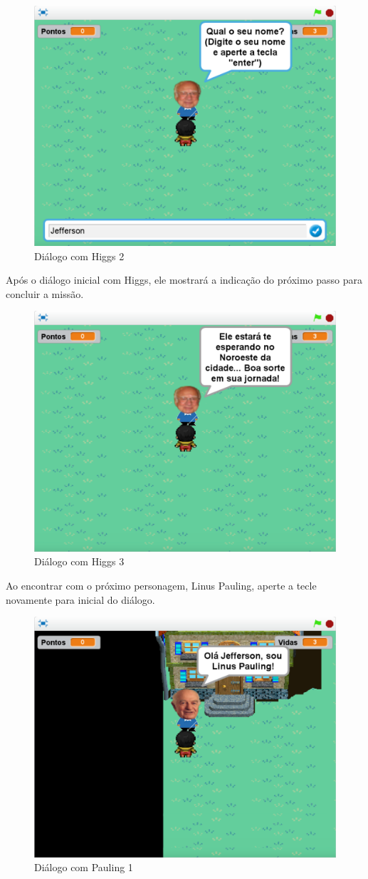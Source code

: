 \documentclass[12pt,fleqn]{book} %
\begin{document}
\begin{figure}[h]
	\centering
	\includegraphics[width=0.65 \textwidth]{Produto/jogo_4}
	\caption{Diálogo com Higgs 2}
	\label{fig:app_a:jogo4}
\end{figure}

\newpage

Após o diálogo inicial com Higgs, ele mostrará a indicação do próximo passo para concluir a missão.

\begin{figure}[h]
	\centering
	\includegraphics[width=0.65 \textwidth]{Produto/jogo_5}
	\caption{Diálogo com Higgs 3}
	\label{fig:app_a:jogo5}
\end{figure}

Ao encontrar com o próximo personagem, Linus Pauling, aperte a tecle novamente  para inicial do diálogo.

\begin{figure}[h]
	\centering
	\includegraphics[width=0.65 \textwidth]{Produto/jogo_6}
	\caption{Diálogo com Pauling 1}
	\label{fig:app_a:jogo6}
\end{figure}
\end{document}
